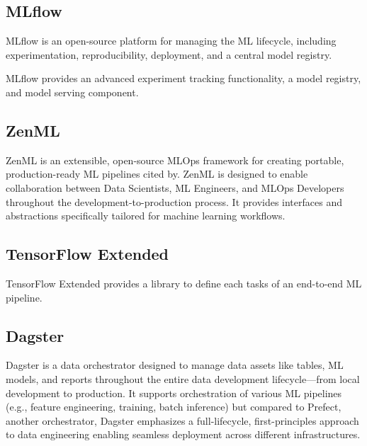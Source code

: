 \subsection{MLflow}\label{subsec:mlflow}
MLflow is an open-source platform for managing the ML lifecycle, including experimentation, reproducibility,
deployment, and a central model registry.\cite{mlflow}

MLflow provides an advanced experiment tracking functionality, a model registry, and
model serving component\cite{Kreuzberger2022MachineLO}.

\subsection{ZenML}\label{subsec:zenml}
ZenML is an extensible, open-source MLOps framework for creating portable, production-ready ML pipelines cited by\cite{blockchain-mlops}.
ZenML is designed to enable collaboration between Data Scientists, ML Engineers, and MLOps Developers throughout the development-to-production process\cite{landscape}.
It provides interfaces and abstractions specifically tailored for machine learning workflows.

\subsection{TensorFlow Extended}\label{subsec:tensorflow-extended}
TensorFlow Extended provides a library to define each tasks of an end-to-end ML
pipeline\cite{Kreuzberger2022MachineLO}.

\subsection{Dagster}\label{subsec:dagster}
Dagster is a data orchestrator designed to manage data assets like tables, ML models, and reports throughout the entire data development lifecycle—from local development to production\cite{landscape}.
It supports orchestration of various ML pipelines (e.g., feature engineering, training, batch inference) but
compared to Prefect, another orchestrator, Dagster emphasizes a full-lifecycle, first-principles approach to data engineering enabling seamless deployment across different infrastructures\cite{landscape}.
